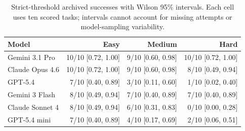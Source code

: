 \begin{table}[ht]
\caption{Strict-threshold archived successes with Wilson 95\% intervals. Each cell uses ten scored tasks; intervals cannot account for missing attempts or model-sampling variability.}
\centering\small
\begin{tabular}{@{}lrrr@{}}
\toprule
Model & Easy & Medium & Hard\\
\midrule
Gemini 3.1 Pro & 10/10 [0.72, 1.00] & 9/10 [0.60, 0.98] & 10/10 [0.72, 1.00]\\
Claude Opus 4.6 & 10/10 [0.72, 1.00] & 9/10 [0.60, 0.98] & 8/10 [0.49, 0.94]\\
GPT-5.4 & 7/10 [0.40, 0.89] & 3/10 [0.11, 0.60] & 1/10 [0.02, 0.40]\\
Gemini 3 Flash & 8/10 [0.49, 0.94] & 7/10 [0.40, 0.89] & 7/10 [0.40, 0.89]\\
Claude Sonnet 4 & 8/10 [0.49, 0.94] & 6/10 [0.31, 0.83] & 0/10 [0.00, 0.28]\\
GPT-5.4 mini & 7/10 [0.40, 0.89] & 4/10 [0.17, 0.69] & 2/10 [0.06, 0.51]\\
\bottomrule
\end{tabular}
\end{table}

